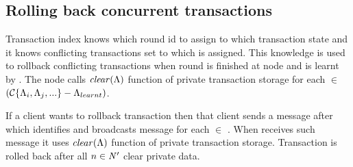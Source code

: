 \subsection{Rolling back concurrent transactions}
Transaction index knows which \paxos round id \paxosRoundId to assign to which transaction state \txState and it knows conflicting transactions set \conflictingTxSet to which \txState is assigned. This knowledge is used to rollback conflicting transactions when \paxos round \paxosRoundId is finished at node  and \txStateCommitted is learnt by . The node calls $\mathit{clear}(\text{$\Lambda$})$ function of private transaction storage for each \mbox{\txState $\in$ $(\text{$\mathcal{C}\text{$\{\Lambda_{i}, \Lambda_{j}, ...\}$}$} - \text{$\Lambda_{learnt}$})$}.

If a client \client wants to rollback transaction \transaction then that client
sends a message \txRollbackMessage after which  identifies \nodesTx and broadcasts message \rollbackMessage for each  $\in$ \nodesTx. When  receives such message it
uses $\mathit{clear}(\text{$\Lambda$})$ function of private transaction storage. Transaction \transaction is rolled back after all 
\mbox{$n\in \text{$\mathit{N'}$}$} clear private data.